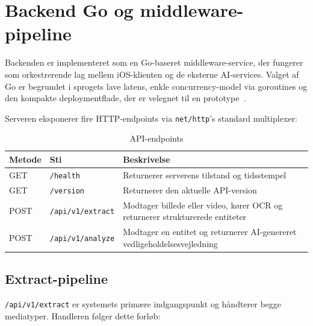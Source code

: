 \section{Backend Go og middleware-pipeline}
\label{sec:backend}

Backenden er implementeret som en Go-baseret middleware-service, der fungerer som orkestrerende lag mellem iOS-klienten og de eksterne AI-services. Valget af Go er begrundet i sprogets lave latens, enkle concurrency-model via goroutines og den kompakte deploymentflade, der er velegnet til en prototype~\cite{go_docs}.

Serveren eksponerer fire HTTP-endpoints via \texttt{net/http}'s standard multiplexer:

\begin{table}[H]
  \centering
  \caption{API-endpoints}
  \label{tab:endpoints}
  \begin{tabularx}{\textwidth}{@{}llX@{}}
    \toprule
    \textbf{Metode} & \textbf{Sti} & \textbf{Beskrivelse} \\
    \midrule
    GET  & \texttt{/health}          & Returnerer serverens tilstand og tidsstempel \\
    \addlinespace
    GET  & \texttt{/version}         & Returnerer den aktuelle API-version \\
    \addlinespace
    POST & \texttt{/api/v1/extract}  & Modtager billede eller video, kører OCR og returnerer strukturerede entiteter \\
    \addlinespace
    POST & \texttt{/api/v1/analyze}  & Modtager en entitet og returnerer AI-genereret vedligeholdelsesvejledning \\
    \bottomrule
  \end{tabularx}
\end{table}

\subsection{Extract-pipeline}
\label{subsec:extract}

\texttt{/api/v1/extract} er systemets primære indgangspunkt og håndterer begge mediatyper. Handleren følger dette forløb:

